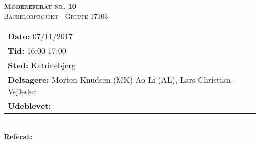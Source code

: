 
\newcommand{\HRule}{\rule{\linewidth}{0.1mm}}


	\begin{center}
		{\huge \bfseries \textsc{Mødereferat nr. 10}}\\
		\textsc{\large Bachelorprojekt - Gruppe 17103}\\[0.3cm]
	\end{center}
	\begin{tabular}{ll}
	\large \textbf{Dato:} 07/11/2017  	\\ %
	\large \textbf{Tid:}  16:00-17:00 	\\ %
	\large \textbf{Sted:} Katrinebjerg		\\ %
	\large \textbf{Deltagere:} Morten Knudsen (MK) Ao Li (AL), Lars Christian - Vejleder \\
	\large \textbf{Udeblevet:} 
	\end{tabular}\\
	\phantom{\,}\hspace{0.1em} \large \textbf{Referat:}
